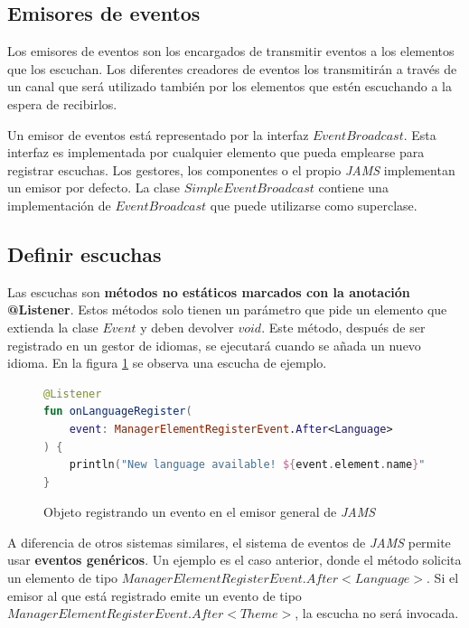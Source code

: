 \subsection{Emisores de eventos}\label{subsec:emisores-de-eventos}

Los emisores de eventos son los encargados de transmitir
eventos a los elementos que los escuchan.
Los diferentes creadores de eventos los transmitirán a través de un
canal que será utilizado también por los elementos que estén
escuchando a la espera de recibirlos.

Un emisor de eventos está representado por la interfaz $EventBroadcast$.
Esta interfaz es implementada por cualquier elemento que pueda emplearse para registrar escuchas.
Los gestores, los componentes o el propio \textit{JAMS} implementan
un emisor por defecto.
La clase $SimpleEventBroadcast$ contiene una implementación de $EventBroadcast$
que puede utilizarse como superclase.

\subsection{Definir escuchas}\label{subsec:definir-escuchas}

Las escuchas son \textbf{métodos no estáticos marcados con la anotación @Listener}.
Estos métodos solo tienen un parámetro que pide un elemento que extienda la clase
$Event$ y deben devolver $void$.
Este método, después de ser registrado en un gestor de idiomas,
se ejecutará cuando se añada un nuevo idioma.
En la figura \ref{fig:listener} se observa una escucha de ejemplo.

\begin{figure}[h]
    \centering
    \begin{lstlisting}[frame=single,label={lst:listener},language=Kotlin]
@Listener
fun onLanguageRegister(
    event: ManagerElementRegisterEvent.After<Language>
) {
    println("New language available! ${event.element.name}")
}
    \end{lstlisting}
    \caption{Objeto registrando un evento en el emisor general de \textit{JAMS}}
    \label{fig:listener}
\end{figure}

A diferencia de otros sistemas similares,
el sistema de eventos de \textit{JAMS} permite usar \textbf{eventos genéricos}.
Un ejemplo es el caso anterior, donde el método solicita un elemento de tipo
$ManagerElementRegisterEvent.After<Language>$.
Si el emisor al que está registrado emite un evento de tipo
$ManagerElementRegisterEvent.After<Theme>$, la escucha no será invocada.

